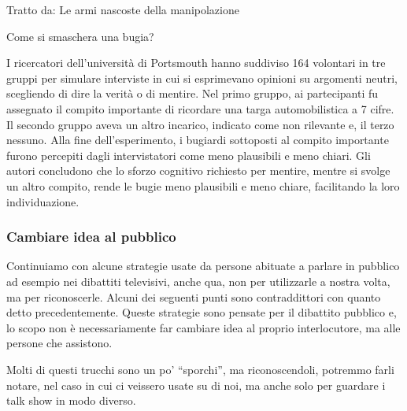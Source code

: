 \documentclass[12pt]{book} %
\begin{document}
Tratto da: Le armi nascoste della manipolazione

\begin{mdframed}[linewidth=1pt]
Come si smaschera una bugia?

I ricercatori dell'università di Portsmouth hanno suddiviso 164 volontari in tre gruppi per simulare interviste in cui si esprimevano opinioni su argomenti neutri, scegliendo di dire la verità o di mentire. Nel primo gruppo, ai partecipanti fu assegnato il compito importante di ricordare una targa automobilistica a 7 cifre. Il secondo gruppo aveva un altro incarico, indicato come non rilevante e, il terzo nessuno. Alla fine dell’esperimento, i bugiardi sottoposti al compito importante furono percepiti dagli intervistatori come meno plausibili e meno chiari. Gli autori concludono che lo sforzo cognitivo richiesto per mentire, mentre si svolge un altro compito, rende le bugie meno plausibili e meno chiare, facilitando la loro individuazione.
\end{mdframed}

\subsubsection{Cambiare idea al pubblico}
Continuiamo con alcune strategie usate da persone abituate a parlare in pubblico ad esempio nei dibattiti televisivi, anche qua, non per utilizzarle a nostra volta, ma per riconoscerle. Alcuni dei seguenti punti sono contraddittori con quanto detto precedentemente. Queste strategie sono pensate per il dibattito pubblico e, lo scopo non è necessariamente far cambiare idea al proprio interlocutore, ma alle persone che assistono. 

Molti di questi trucchi sono un po' “sporchi”, ma riconoscendoli, potremmo farli notare, nel caso in cui ci veissero usate su di noi, ma anche solo per guardare i talk show in modo diverso.
\end{document}
